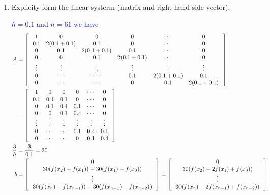 \documentclass[10pt,a4paper]{report}
\newcommand{\BLUE}[1]{\textcolor{blue}{#1}}
\begin{document}
\begin{enumerate}[label=(\alph*)]

	\item Explicity form the linear systerm (matrix and right hand side vector).
	
	\BLUE{$h = 0.1$ and $n=61$ we have
	\begin{align*}
		A &= \left [\, \begin{array}{cccccc}
			1   & 0 & 0 & 0 & \cdots & 0 \\
			0.1 & 2(0.1+0.1) & 0.1 & 0 & \cdots & 0\\
			0 & 0.1 & 2(0.1+0.1) & 0.1 & \cdots & 0\\
			0 & 0 & 0.1 & 2(0.1+0.1) & \cdots & 0\\
			\vdots & \vdots & \vdots, & \vdots & \vdots & \vdots \\
			0 & \cdots & \cdots & 0.1 & 2(0.1+0.1) & 0.1\\
			0 & \cdots & \cdots & 0 & 0.1 & 2(0.1+0.1) \\			
		\end{array}
		 \,\right ] \\
		&= \left [\, \begin{array}{cccccc}
			1   & 0 & 0 & 0 & \cdots & 0 \\
			0.1 & 0.4 & 0.1 & 0 & \cdots & 0\\
			0 & 0.1 & 0.4 & 0.1 & \cdots & 0\\
			0 & 0 & 0.1 & 0.4 & \cdots & 0\\
			\vdots & \vdots & \vdots, & \vdots & \vdots & \vdots \\
			0 & \cdots & \cdots & 0.1 & 0.4 & 0.1\\
			0 & \cdots & \cdots & 0 & 0.1 & 0.4 \\			
		\end{array}
		 \,\right ] \\
		\frac{3}{h} &= \frac{3}{0.1} = 30 \\
		b &= \left [\, \begin{array}{c}
			0 \\
			30(f(x_2) -f(x_1))-30(f(x_1)-f(x_0))\\
			\vdots \\
			30(f(x_n) -f(x_{n-1}))-30(f(x_{n-1})-f(x_{n-2}))\\
		\end{array}
		 \,\right ] = \left [\, \begin{array}{c}
			0 \\
			30(f(x_2) -2f(x_1)+f(x_0))\\
			\vdots \\
			30(f(x_n) -2f(x_{n-1}) +f(x_{n-2}))\\
		\end{array}		
		 \,\right ]
	\end{align*}
	}
	

\end{enumerate}
\end{document}
